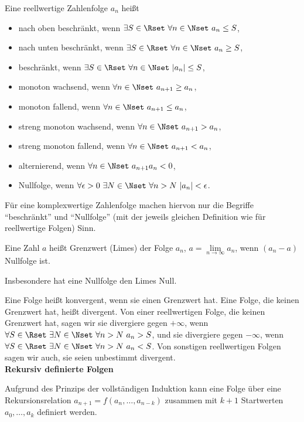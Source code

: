 \documentclass[a4paper,10pt]{article}
\begin{document}
Eine reellwertige Zahlenfolge $a_n$ heißt
\begin{itemize}\setlength\itemsep{0pt}\parskip0pt\setlength\parsep{0pt}
\item {nach oben beschränkt}, wenn $\exists S\in\Rset~\forall n\in\Nset~a_n\le S$,
\item {nach unten beschränkt}, wenn $\exists S\in\Rset~\forall n\in\Nset~a_n\ge S$,
\item {beschränkt}, wenn $\exists S\in\Rset~\forall n\in\Nset~|a_n|\le S$,
\item {monoton wachsend}, wenn $\forall n\in\Nset~a_{n+1}\ge a_n$,
\item {monoton fallend}, wenn $\forall n\in\Nset~a_{n+1}\le a_n$,
\item {streng monoton wachsend}, wenn $\forall n\in\Nset~a_{n+1}> a_n$,
\item {streng monoton fallend}, wenn $\forall n\in\Nset~a_{n+1}< a_n$,
\item {alternierend}, wenn $\forall n\in\Nset~a_{n+1}a_n<0$,
\item {Nullfolge}, wenn $\forall \epsilon>0~\exists N\in\Nset~\forall n>N~|a_n|<\epsilon$.
\end{itemize}
Für eine komplexwertige Zahlenfolge machen hiervon nur die Begriffe ``beschränkt'' und ``Nullfolge'' (mit der jeweils gleichen Definition wie für reellwertige Folgen) Sinn.

Eine Zahl $a$ heißt Grenzwert (Limes) der Folge $a_n$,
$a=\lim\limits_{n\to\infty} a_n$, wenn $(a_n-a)$ Nullfolge ist.

Insbesondere hat eine Nullfolge den Limes Null.

Eine Folge heißt {konvergent}, wenn sie einen Grenzwert hat. Eine Folge, die keinen Grenzwert hat, heißt {divergent}.
Von einer reellwertigen Folge, die keinen Grenzwert hat, sagen wir
sie divergiere gegen $+\infty$, wenn $\forall S\in\Rset~\exists N\in\Nset~\forall n>N~a_n>S$, und
sie divergiere gegen $-\infty$, wenn $\forall S\in\Rset~\exists N\in\Nset~\forall n>N~a_n<S$.
Von sonstigen reellwertigen Folgen sagen wir auch, sie seien unbestimmt
divergent.\\


{\bf Rekursiv definierte Folgen}

Aufgrund des Prinzips der vollständigen Induktion kann eine Folge über
eine Rekursionsrelation $a_{n+1}=f(a_n,\ldots,a_{n-k})$
zusammen mit $k+1$ Startwerten $a_0,\ldots,a_k$ definiert werden.
\end{document}
